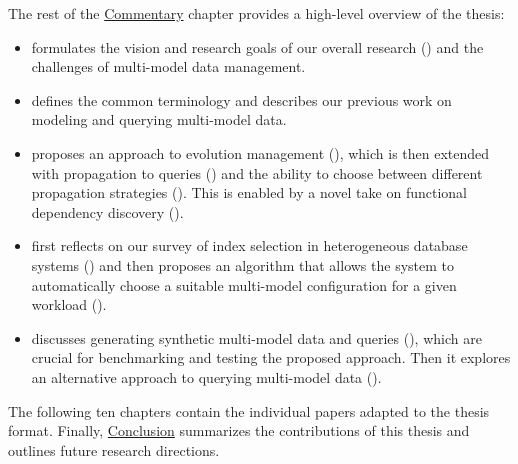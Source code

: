 The rest of the \hyperref[chap:commentary]{Commentary} chapter provides a high-level overview of the thesis:
\begin{itemize}
    \item {} formulates the vision and research goals of our overall research () and the challenges of multi-model data management.
    \item {} defines the common terminology and describes our previous work on modeling and querying multi-model data.
    \item {} proposes an approach to evolution management (), which is then extended with propagation to queries () and the ability to choose between different propagation strategies (). This is enabled by a novel take on functional dependency discovery ().
    \item {} first reflects on our survey of index selection in heterogeneous database systems () and then proposes an algorithm that allows the system to automatically choose a suitable multi-model configuration for a given workload ().
    \item {} discusses generating synthetic multi-model data and queries (), which are crucial for benchmarking and testing the proposed approach. Then it explores an alternative approach to querying multi-model data ().
\end{itemize}

The following ten chapters contain the individual papers adapted to the thesis format. Finally, \hyperref[chap:conclusion]{Conclusion} summarizes the contributions of this thesis and outlines future research directions.
